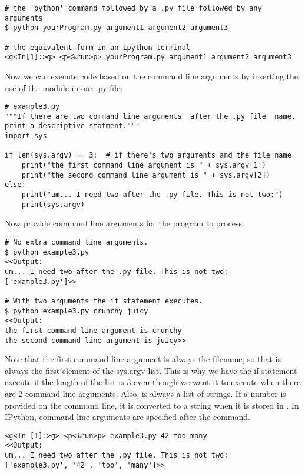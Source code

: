 \begin{lstlisting}
# the 'python' command followed by a .py file followed by any arguments	
$ python yourProgram.py argument1 argument2 argument3  

# the equivalent form in an ipython terminal
<g<In[1]:>g> <p<%run>p> yourProgram.py argument1 argument2 argument3  		
\end{lstlisting}

Now we can execute code based on the command line arguments by inserting the use of the  module in our .py file:

\begin{lstlisting}
# example3.py
"""If there are two command line arguments  after the .py file  name, print a descriptive statment."""
import sys

if len(sys.argv) == 3:  # if there's two arguments and the file name
    print("the first command line argument is " + sys.argv[1]) 
    print("the second command line argument is " + sys.argv[2]) 
else:
    print("um... I need two after the .py file. This is not two:")
    print(sys.argv)
\end{lstlisting}

Now provide command line arguments for the program to process.\\

\begin{lstlisting}
# No extra command line arguments.
$ python example3.py                
<<Output: 
um... I need two after the .py file. This is not two:
['example3.py']>>

# With two arguments the if statement executes.
$ python example3.py crunchy juicy   
<<Output:
the first command line argument is crunchy
the second command line argument is juicy>>
\end{lstlisting}

Note that the first command line argument is always the filename, so that is always the first element of the sys.argv list. This is why we have the if statement execute if the length of the list is 3 even though we want it to execute when there are 2 command line arguments. Also,  is always a list of strings. If a number is provided on the command line, it is converted to a string when it is stored in .
In IPython, command line arguments are specified after the  command.

\begin{lstlisting}
<g<In [1]:>g> <p<%run>p> example3.py 42 too many
<<Output:
um... I need two after the .py file. This is not two:
['example3.py', '42', 'too', 'many']>>
\end{lstlisting}

